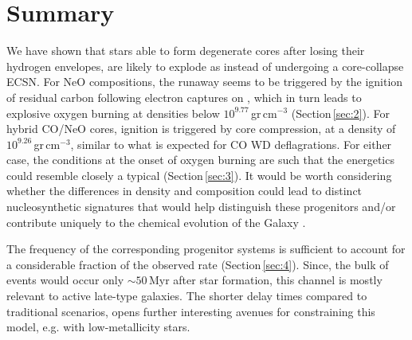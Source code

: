 \documentclass[../../main/thesis_msc.tex]{subfiles}
\begin{document}
\section{Summary}\label{sec:5}
We have shown that stars able to form degenerate \one cores after losing 
their hydrogen  envelopes, are likely to explode as \ias instead of undergoing a core-collapse ECSN. 
For NeO compositions, the runaway seems to be triggered by the ignition of 
residual carbon following electron captures on , which in turn 
leads to explosive oxygen burning at densities below $10^{9.77}$\,gr\,cm$^{-3}$ (Section\,\ref{sec:2}). 
For hybrid CO/NeO cores, ignition is triggered by core compression, at a density of $10^{9.26}$\,gr\,cm$^{-3}$, similar to what is expected for CO WD deflagrations. For either case, the conditions at the onset of oxygen burning are such that the energetics  could resemble closely a typical \ias  (Section\,\ref{sec:3}). 
It would be worth considering whether the differences in density and 
composition could lead to distinct nucleosynthetic signatures that would help 
distinguish these progenitors and/or contribute uniquely to the chemical 
evolution of the Galaxy \citep[in analogy to][for ECSNe]{Jones:2018ule}.



The frequency of the corresponding progenitor systems 
is sufficient to account for a considerable fraction of the observed \ia  rate  (Section\,\ref{sec:4}). Since, the bulk of events would occur only $\sim 50$\,Myr after star formation, this channel is mostly relevant to active late-type galaxies. The shorter delay times compared to traditional \ia scenarios, opens further interesting avenues for constraining this model, e.g. with low-metallicity stars.  
\end{document}
